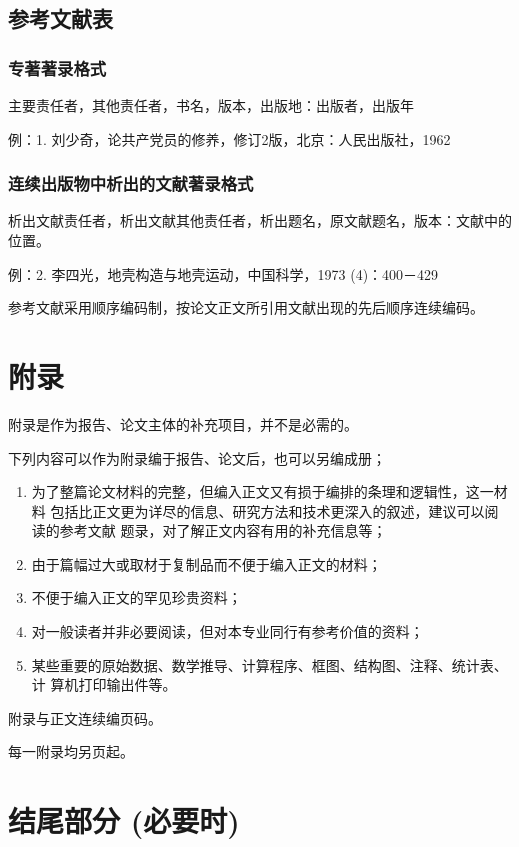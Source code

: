\documentclass[master]{njuthesis}
\begin{document}
\subsection{参考文献表}

\subsubsection{专著著录格式}

主要责任者，其他责任者，书名，版本，出版地：出版者，出版年

例：1. 刘少奇，论共产党员的修养，修订2版，北京：人民出版社，1962

\subsubsection{连续出版物中析出的文献著录格式}

析出文献责任者，析出文献其他责任者，析出题名，原文献题名，版本：文献中的位置。

例：2. 李四光，地壳构造与地壳运动，中国科学，1973 (4)：400－429

参考文献采用顺序编码制，按论文正文所引用文献出现的先后顺序连续编码。

\section{附录}

附录是作为报告、论文主体的补充项目，并不是必需的。

下列内容可以作为附录编于报告、论文后，也可以另编成册；

\begin{enumerate}
\item 为了整篇论文材料的完整，但编入正文又有损于编排的条理和逻辑性，这一材料
包括比正文更为详尽的信息、研究方法和技术更深入的叙述，建议可以阅读的参考文献
题录，对了解正文内容有用的补充信息等；
\item 由于篇幅过大或取材于复制品而不便于编入正文的材料；
\item 不便于编入正文的罕见珍贵资料；
\item 对一般读者并非必要阅读，但对本专业同行有参考价值的资料；
\item 某些重要的原始数据、数学推导、计算程序、框图、结构图、注释、统计表、计
算机打印输出件等。
\end{enumerate}

附录与正文连续编页码。

每一附录均另页起。

\section{结尾部分 (必要时)}
\end{document}
